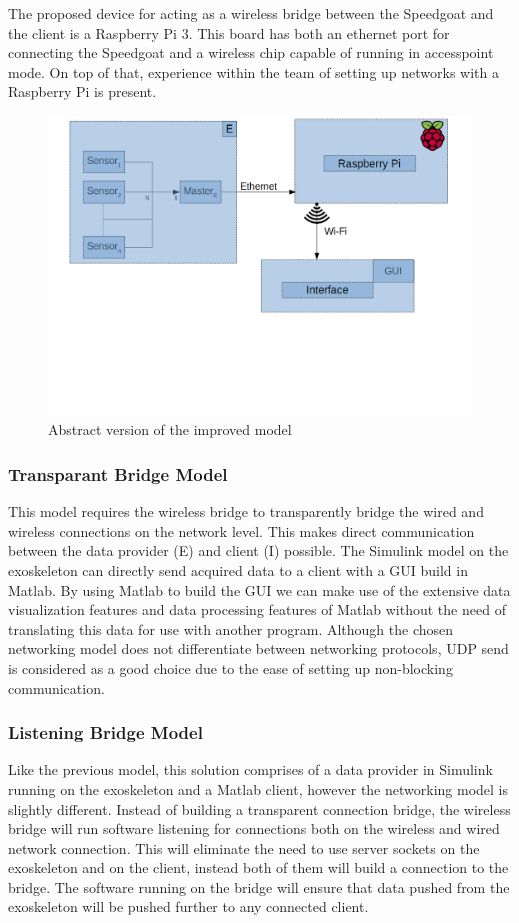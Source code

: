 The proposed device for acting as a wireless bridge between the Speedgoat and the client is a Raspberry Pi 3. This board has both an ethernet port for connecting the Speedgoat and a wireless chip capable of running in accesspoint mode. On top of that, experience within the team of setting up networks with a Raspberry Pi is present.\\

\begin{figure}[H]
	\centering
	\includegraphics[width=.75\textwidth]{ERBI-Model-RaspPie}
	\caption{Abstract version of the improved model} 
	\label{fig:improvedmodel}
\end{figure} 

\subsubsection{Transparant Bridge Model}\label{sec:tbm}
This model requires the wireless bridge to transparently bridge the wired and wireless connections on the network level. This makes direct communication between the data provider (E) and client (I) possible. The Simulink model on the exoskeleton can directly send acquired data to a client with a GUI build in Matlab. By using Matlab to build the GUI we can make use of the extensive data visualization features and data processing features of Matlab without the need of translating this data for use with another program. 
Although the chosen networking model does not differentiate between networking protocols, UDP send \cite{web:UDPSend} is considered as a good choice due to the ease of setting up non-blocking communication.

\subsubsection{Listening Bridge Model}\label{sec:lbm}
Like the previous model, this solution comprises of a data provider in Simulink running on the exoskeleton and a Matlab client, however the networking model is slightly different. Instead of building a transparent connection bridge, the wireless bridge will run software listening for connections both on the wireless and wired network connection. This will eliminate the need to use server sockets on the exoskeleton and on the client, instead both of them will build a connection to the bridge. The software running on the bridge will ensure that data pushed from the exoskeleton will be pushed further to any connected client.

